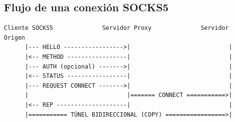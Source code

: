 \documentclass[12pt,a4paper]{article}
\begin{document}
\subsection{Flujo de una conexión SOCKS5}

\begin{verbatim}
Cliente SOCKS5              Servidor Proxy              Servidor Origen
      |--- HELLO ----------------->|                            |
      |<-- METHOD -----------------|                            |
      |--- AUTH (opcional) ------->|                            |
      |<-- STATUS -----------------|                            |
      |--- REQUEST CONNECT ------->|                            |
      |                            |======= CONNECT ===========>|
      |<-- REP --------------------|                            |
      |=========== TÚNEL BIDIRECCIONAL (COPY) =================>|
\end{verbatim}
\end{document}
